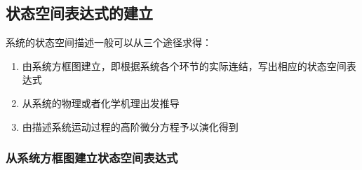 \subsection{状态空间表达式的建立}
系统的状态空间描述一般可以从三个途径求得：
\begin{enumerate}
    \item 由系统方框图建立，即根据系统各个环节的实际连结，写出相应的状态空间表达式
    \item 从系统的物理或者化学机理出发推导
    \item 由描述系统运动过程的高阶微分方程予以演化得到
\end{enumerate}

\subsubsection{从系统方框图建立状态空间表达式}

